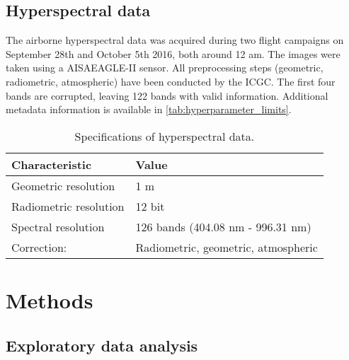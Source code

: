 \documentclass[review]{elsarticle}
\begin{document}


\subsection{Hyperspectral data}

\noindent The airborne hyperspectral data was acquired during two flight campaigns on September 28th and October 5th 2016, both around 12 am.
The images were taken using a AISAEAGLE-II sensor.
All preprocessing steps (geometric, radiometric, atmospheric) have been conducted by the \ac{ICGC}.
The first four bands are corrupted, leaving 122 bands with valid information.
Additional metadata information is available in \autoref{tab:hyperparameter_limits}.

\begin{table}[b!]
\centering
\caption[t]{Specifications of hyperspectral data.}
\begingroup\footnotesize
\begin{tabular}{ll}
	\\
	Characteristic         & Value                               \\
	\hline
	Geometric resolution   & 1 m                                 \\
	Radiometric resolution & 12 bit                              \\
	Spectral resolution    & 126 bands (404.08 nm - 996.31 nm)   \\
	Correction:            & Radiometric, geometric, atmospheric
\end{tabular}
\endgroup
\label{tab:hyperparameter_limits}
\end{table}



\section{Methods}

\subsection{Exploratory data analysis}
\end{document}
